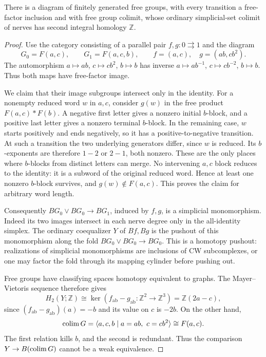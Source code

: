 \begin{proposition}\label{C:freefactor-nerve}
There is a diagram of finitely generated free groups, with every
transition a free-factor inclusion and with free group colimit, whose
ordinary simplicial-set colimit of nerves has second integral homology
$\mathbb Z$.
\end{proposition}
\begin{proof}
Use the category consisting of a parallel pair $f,g:0\rightrightarrows1$
and the diagram
\[
 G_0=F(a,c),\qquad G_1=F(a,c,b),\qquad
 f=(a,c),\quad g=(ab,cb^2).
\]
The automorphism $a\mapsto ab$, $c\mapsto cb^2$, $b\mapsto b$
has inverse $a\mapsto ab^{-1}$, $c\mapsto cb^{-2}$, $b\mapsto b$.
Thus both maps have free-factor image.

We claim that their image subgroups intersect only in the identity.
For a nonempty reduced word $w$ in $a,c$, consider $g(w)$ in the free
product $F(a,c)*F(b)$. A negative first letter gives a nonzero initial
$b$-block, and a positive last letter gives a nonzero terminal $b$-block.
In the remaining case, $w$ starts positively and ends negatively, so it
has a positive-to-negative transition. At such a transition the two
underlying generators differ, since $w$ is reduced. Its $b$-exponents
are therefore $1-2$ or $2-1$, both nonzero. These are the only places
where $b$-blocks from distinct letters can merge. No intervening
$a,c$ block reduces to the identity: it is a subword of the original
reduced word. Hence at least one nonzero $b$-block survives, and
$g(w)\notin F(a,c)$. This proves the claim for arbitrary word length.

Consequently $BG_0\vee BG_0\to BG_1$, induced by $f,g$, is a
simplicial monomorphism. Indeed its two images intersect in each nerve
degree only in the all-identity simplex. The ordinary coequalizer $Y$
of $Bf,Bg$ is the pushout of this monomorphism along the fold
$BG_0\vee BG_0\to BG_0$. This is a homotopy pushout: realizations of
simplicial monomorphisms are inclusions of CW subcomplexes, or one may
factor the fold through its mapping cylinder before pushing out.

Free groups have classifying spaces homotopy equivalent to graphs.
The Mayer--Vietoris sequence therefore gives
\[
 H_2(Y;\mathbb Z)\cong
 \ker(f_{\mathrm{ab}}-g_{\mathrm{ab}}:\mathbb Z^2\to\mathbb Z^3)
 =\mathbb Z(2a-c),
\]
since $(f_{\mathrm{ab}}-g_{\mathrm{ab}})(a)=-b$ and its value on $c$
is $-2b$. On the other hand,
\[
 \operatorname*{colim} G=\langle a,c,b\mid a=ab,\ c=cb^2\rangle\cong F(a,c).
\]
The first relation kills $b$, and the second is redundant. Thus the
comparison $Y\to B(\operatorname*{colim} G)$ cannot be a weak equivalence.
\end{proof}

